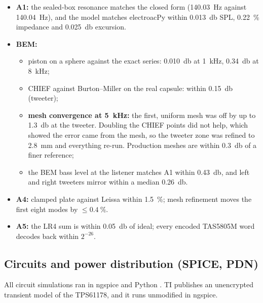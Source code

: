 \begin{checked}
\begin{itemize}[leftmargin=1.2em,itemsep=1pt]
  \item \textbf{A1:} the sealed-box resonance matches the closed form (\qty{140.03}{\hertz} against \qty{140.04}{\hertz}), and the model matches electroacPy within \qty{0.013}{\decibel} SPL, \qty{0.22}{\percent} impedance and \qty{0.025}{\decibel} excursion.
  \item \textbf{BEM:}
  \begin{itemize}[leftmargin=1.2em,itemsep=0pt]
    \item piston on a sphere against the exact series: \qty{0.010}{\decibel} at \qty{1}{\kilo\hertz}, \qty{0.34}{\decibel} at \qty{8}{\kilo\hertz};
    \item CHIEF against Burton--Miller on the real capsule: within \qty{0.15}{\decibel} (tweeter);
    \item \textbf{mesh convergence at \qty{5}{\kilo\hertz}:} the first, uniform mesh was off by up to \qty{1.3}{\decibel} at the tweeter. Doubling the CHIEF points did not help, which showed the error came from the mesh, so the tweeter zone was refined to \qty{2.8}{\milli\metre} and everything re-run. Production meshes are within \qty{0.3}{\decibel} of a finer reference;
    \item the BEM bass level at the listener matches A1 within \qty{0.43}{\decibel}, and left and right tweeters mirror within a median \qty{0.26}{\decibel}.
  \end{itemize}
  \item \textbf{A4:} clamped plate against Leissa within \qty{1.5}{\percent}; mesh refinement moves the first eight modes by $\le\qty{0.4}{\percent}$.
  \item \textbf{A5:} the LR4 sum is within \qty{0.05}{\decibel} of ideal; every encoded TAS5805M word decodes back within $2^{-26}$.
\end{itemize}
\end{checked}

\FloatBarrier
\subsection{Circuits and power distribution (SPICE, PDN)}\label{sec:spice}

All circuit simulations ran in ngspice and Python . TI publishes an unencrypted transient model of the TPS61178, and it runs unmodified in ngspice.

